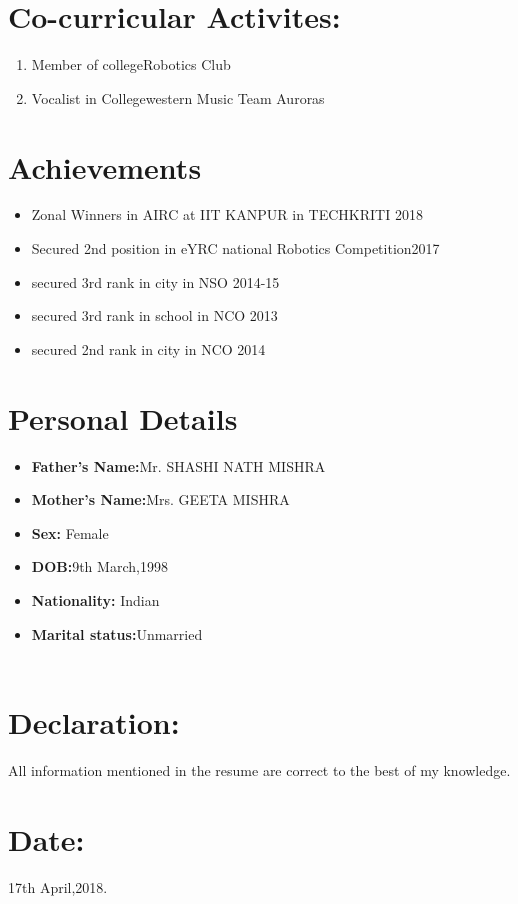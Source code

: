 \documentclass[11pt]{article}
\begin{document}
\section{Co-curricular Activites:}
\begin{enumerate}
\item Member of college{Robotics Club}
\item Vocalist in College{western Music Team Auroras}
\end{enumerate}
\section{Achievements}
\begin{itemize}
\item Zonal Winners in AIRC at IIT KANPUR in TECHKRITI 2018
\item Secured 2nd position in eYRC national Robotics Competition2017
\item secured 3rd rank in city in NSO 2014-15
\item secured 3rd rank in school in NCO 2013
\item secured 2nd rank in city in NCO  2014
\end{itemize}
\section{Personal Details}
\begin{itemize}
\item \textbf{Father's Name:}Mr. SHASHI NATH MISHRA
\newpage
\item \textbf{Mother's Name:}Mrs. GEETA MISHRA

\item \textbf{Sex:} Female
\item\textbf{ DOB:}9th March,1998
\item \textbf{Nationality:} Indian
\item \textbf{Marital status:}Unmarried      \\
\\
\newpage

\end{itemize}
\section{Declaration:}All information mentioned in the resume are correct to the best of my knowledge.\\

\section{Date:}17th April,2018.
\end{document}
